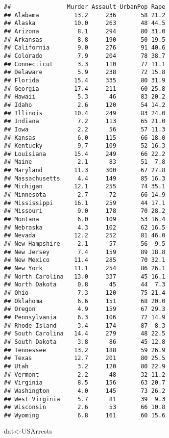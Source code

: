 \documentclass[
]{article}
\newenvironment{Shaded}{\begin{snugshade}}{\end{snugshade}}
\newcommand{\NormalTok}[1]{#1}
\begin{document}
\begin{verbatim}
##                Murder Assault UrbanPop Rape
## Alabama          13.2     236       58 21.2
## Alaska           10.0     263       48 44.5
## Arizona           8.1     294       80 31.0
## Arkansas          8.8     190       50 19.5
## California        9.0     276       91 40.6
## Colorado          7.9     204       78 38.7
## Connecticut       3.3     110       77 11.1
## Delaware          5.9     238       72 15.8
## Florida          15.4     335       80 31.9
## Georgia          17.4     211       60 25.8
## Hawaii            5.3      46       83 20.2
## Idaho             2.6     120       54 14.2
## Illinois         10.4     249       83 24.0
## Indiana           7.2     113       65 21.0
## Iowa              2.2      56       57 11.3
## Kansas            6.0     115       66 18.0
## Kentucky          9.7     109       52 16.3
## Louisiana        15.4     249       66 22.2
## Maine             2.1      83       51  7.8
## Maryland         11.3     300       67 27.8
## Massachusetts     4.4     149       85 16.3
## Michigan         12.1     255       74 35.1
## Minnesota         2.7      72       66 14.9
## Mississippi      16.1     259       44 17.1
## Missouri          9.0     178       70 28.2
## Montana           6.0     109       53 16.4
## Nebraska          4.3     102       62 16.5
## Nevada           12.2     252       81 46.0
## New Hampshire     2.1      57       56  9.5
## New Jersey        7.4     159       89 18.8
## New Mexico       11.4     285       70 32.1
## New York         11.1     254       86 26.1
## North Carolina   13.0     337       45 16.1
## North Dakota      0.8      45       44  7.3
## Ohio              7.3     120       75 21.4
## Oklahoma          6.6     151       68 20.0
## Oregon            4.9     159       67 29.3
## Pennsylvania      6.3     106       72 14.9
## Rhode Island      3.4     174       87  8.3
## South Carolina   14.4     279       48 22.5
## South Dakota      3.8      86       45 12.8
## Tennessee        13.2     188       59 26.9
## Texas            12.7     201       80 25.5
## Utah              3.2     120       80 22.9
## Vermont           2.2      48       32 11.2
## Virginia          8.5     156       63 20.7
## Washington        4.0     145       73 26.2
## West Virginia     5.7      81       39  9.3
## Wisconsin         2.6      53       66 10.8
## Wyoming           6.8     161       60 15.6
\end{verbatim}

\begin{Shaded}
\begin{Highlighting}[]
\NormalTok{dat<-USArrests}
\end{Highlighting}
\end{Shaded}
\end{document}
